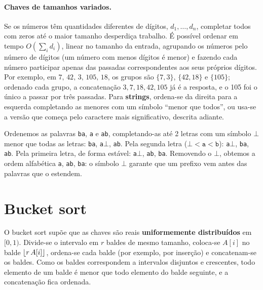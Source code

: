 \paragraph{Chaves de tamanhos variados.} Se os números têm quantidades diferentes de dígitos, $d_1,\dots,d_n$, completar todos com zeros até o maior tamanho desperdiça trabalho. É possível ordenar em tempo $O(\sum_id_i)$, linear no tamanho da entrada, agrupando os números pelo número de dígitos (um número com menos dígitos é menor) e fazendo cada número participar apenas das passadas correspondentes aos seus próprios dígitos. Por exemplo, em $7,\,42,\,3,\,105,\,18$, os grupos são $\{7,3\}$, $\{42,18\}$ e $\{105\}$; ordenado cada grupo, a concatenação $3,7,18,42,105$ já é a resposta, e o 105 foi o único a passar por três passadas. Para \textbf{strings}, ordena-se da direita para a esquerda completando as menores com um símbolo ``menor que todos'', ou usa-se a versão que começa pelo caractere mais significativo, descrita adiante.

\begin{exemplo}\label{ex:strings}
Ordenemos as palavras \texttt{ba}, \texttt{a} e \texttt{ab}, completando-as até 2 letras com um símbolo $\bot$ menor que todas as letras: \texttt{ba}, \texttt{a}$\bot$, \texttt{ab}. Pela segunda letra ($\bot<\mathtt{a}<\mathtt{b}$): \texttt{a}$\bot$, \texttt{ba}, \texttt{ab}. Pela primeira letra, de forma estável: \texttt{a}$\bot$, \texttt{ab}, \texttt{ba}. Removendo o $\bot$, obtemos a ordem alfabética \texttt{a}, \texttt{ab}, \texttt{ba}: o símbolo $\bot$ garante que um prefixo vem antes das palavras que o estendem.
\end{exemplo}

\section{Bucket sort}\label{sec:bucket}
O bucket sort supõe que as chaves são reais \textbf{uniformemente distribuídos} em $[0,1)$. Divide-se o intervalo em $r$ baldes de mesmo tamanho, coloca-se $A[i]$ no balde $\lfloor r\,A[i]\rfloor$, ordena-se cada balde (por exemplo, por inserção) e concatenam-se os baldes. Como os baldes correspondem a intervalos disjuntos e crescentes, todo elemento de um balde é menor que todo elemento do balde seguinte, e a concatenação fica ordenada.


